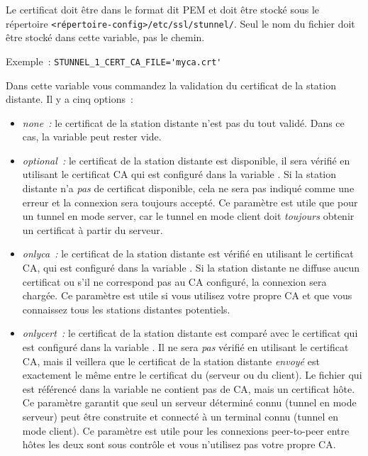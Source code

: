 \begin{description}
Le certificat doit être dans le format dit PEM et doit être stocké sous le répertoire
\texttt{<répertoire-config>/etc/ssl/stunnel/}. Seul le nom du fichier doit être stocké dans
cette variable, pas le chemin.

Exemple~: \verb+STUNNEL_1_CERT_CA_FILE='myca.crt'+


Dans cette variable vous commandez la validation du certificat de la station distante. Il y a
cinq options~:

\begin{itemize}
\item \emph{none~:} le certificat de la station distante n'est pas du tout validé. Dans ce
cas, la variable  peut rester vide.

\item \emph{optional~:} le certificat de la station distante est disponible, il sera
vérifié en utilisant le certificat CA qui est configuré dans la variable .
Si la station distante n'a \emph{pas} de certificat disponible, cela ne sera pas indiqué
comme une erreur et la connexion sera toujours accepté. Ce paramètre est utile que pour un
tunnel en mode server, car le tunnel en mode client doit \emph{toujours} obtenir un certificat
à partir du serveur.

\item \emph{onlyca~:} le certificat de la station distante est vérifié en utilisant le certificat
CA, qui est configuré dans la variable . Si la station distante
ne diffuse aucun certificat ou s'il ne correspond pas au CA configuré, la connexion sera chargée.
Ce paramètre est utile si vous utilisez votre propre CA et que vous connaissez tous
les stations distantes potentiels.

\item \emph{onlycert~:} le certificat de la station distante est comparé avec le certificat
qui est configuré dans la variable . Il ne sera
\emph{pas} vérifié en utilisant le certificat CA, mais il veillera que le certificat de
la station distante \emph{envoyé} est exactement le même entre le certificat du (serveur ou
du client). Le fichier qui est référencé dans la variable 
ne contient pas de CA, mais un certificat hôte. Ce paramètre garantit que seul un serveur
déterminé connu (tunnel en mode serveur) peut être construite et connecté à un terminal connu
(tunnel en mode client). Ce paramètre est utile pour les connexions peer-to-peer entre hôtes
les deux sont sous contrôle et vous n'utilisez pas votre propre CA.


\end{itemize}
\end{description}
